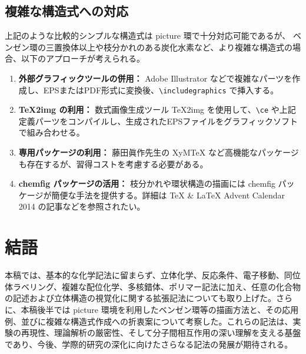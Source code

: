 \documentclass{ltjsarticle}
\begin{document}
\subsection{複雑な構造式への対応}
上記のような比較的シンプルな構造式は picture 環で十分対応可能であるが、  
ベンゼン環の三置換体以上や枝分かれのある炭化水素など、より複雑な構造式の場合、以下のアプローチが考えられる。
\begin{enumerate}
  \item \textbf{外部グラフィックツールの併用：} Adobe Illustrator などで複雑なパーツを作成し、EPSまたはPDF形式に変換後、\verb|\includegraphics| で挿入する。
  \item \textbf{TeX2img の利用：} 数式画像生成ツール TeX2img を使用して、\verb|\ce| や上記定義パーツをコンパイルし、生成されたEPSファイルをグラフィックソフトで組み合わせる。
  \item \textbf{専用パッケージの利用：} 藤田眞作先生の XyMTeX など高機能なパッケージも存在するが、習得コストを考慮する必要がある。
  \item \textbf{chemfig パッケージの活用：} 枝分かれや環状構造の描画には chemfig パッケージが簡便な手法を提供する。詳細は TeX \& LaTeX Advent Calendar 2014 の記事などを参照されたい。
\end{enumerate}

\section{結語}
本稿では、基本的な化学記法に留まらず、立体化学、反応条件、電子移動、同位体ラベリング、複雑な配位化学、多核錯体、ポリマー記法に加え、任意の化合物の記述および立体構造の視覚化に関する拡張記法についても取り上げた。さらに、本稿後半では picture 環境を利用したベンゼン環等の描画方法と、その応用例、並びに複雑な構造式作成への折衷案について考察した。これらの記法は、実験の再現性、理論解析の厳密性、そして分子間相互作用の深い理解を支える基盤であり、今後、学際的研究の深化に向けたさらなる記法の発展が期待される。
\end{document}
